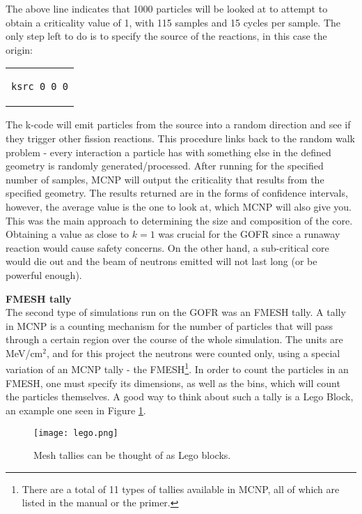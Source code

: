 The above line indicates that 1000 particles will be looked at to attempt to obtain a criticality value of 1, with 115 samples and 15 cycles per sample. The only step left to do is to specify the source of the reactions, in this case the origin:

\begin{center}
\begin{tabular}{c}
\begin{lstlisting}
ksrc 0 0 0
\end{lstlisting}
\end{tabular}
\end{center}

The k-code will emit particles from the source into a random direction and see if they trigger other fission reactions. This procedure links back to the random walk problem - every interaction a particle has with something else in the defined geometry is randomly generated/processed. After running for the specified number of samples, MCNP will output the criticality that results from the specified geometry. The results returned are in the forms of confidence intervals, however, the average value is the one to look at, which MCNP will also give you. This was the main approach to determining the size and composition of the core. Obtaining a value as close to $k=1$ was crucial for the GOFR since a runaway reaction would cause safety concerns. On the other hand, a sub-critical core would die out and the beam of neutrons emitted will not last long (or be powerful enough).

\textbf{FMESH tally}\\

The second type of simulations run on the GOFR was an FMESH tally. A tally in MCNP is a counting mechanism for the number of particles that will pass through a certain region over the course of the whole simulation. The units are MeV/cm$^2$, and for this project the neutrons were counted only, using a special variation of an MCNP tally - the FMESH\footnote{There are a total of 11 types of tallies available in MCNP, all of which are listed in the manual or the primer.}. In order to count the particles in an FMESH, one must specify its dimensions, as well as the bins, which will count the particles themselves. A good way to think about such a tally is a Lego Block, an example one seen in Figure \ref{fig:lego}.

\begin{figure}[!htbp]
\centering
\texttt{[image: lego.png]}
\caption{Mesh tallies can be thought of as Lego blocks.}
\label{fig:lego}
\end{figure}

